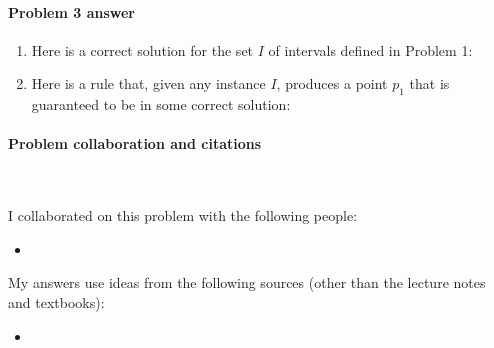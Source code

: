 \paragraph{Problem 3 answer} 

\begin{enumerate}[label=(\alph*)]

\item Here is a correct solution for the set $I$ of intervals defined in Problem 1: 

  \BLUE{
    \[
      P = \{
      \REPLACEME
      \}
    \]
  }

\item Here is a rule that, given any instance $I$, produces a point $p_1$ that
  is guaranteed to be in some correct solution:    \medskip

  \begin{blue}
    
    \REPLACEME
    
  \end{blue}
  
\end{enumerate}

\continued 


\paragraph{Problem  collaboration and citations}~

I collaborated on this problem with the following people:
\begin{blue}
  \begin{itemize}
  \item \REPLACEME                    %
  \end{itemize}
\end{blue}

My answers use ideas from the following sources (other than the lecture notes and textbooks): 
\begin{blue}
  \begin{itemize}
  \item \REPLACEME                    %
  \end{itemize}
\end{blue}

